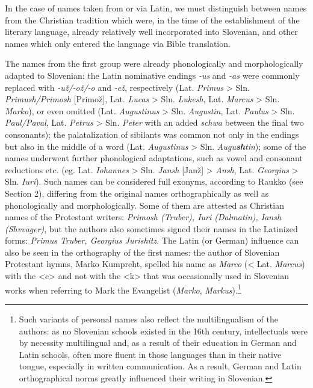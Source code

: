 \documentclass[output=paper,colorlinks,citecolor=brown,arabicfont,chinesefont]{langscibook}
\begin{document}
In the case of names taken from or via Latin, we must distinguish between names from the Christian tradition which were, in the time of the establishment of the literary language, already relatively well incorporated into Slovenian, and other names which only entered the language via Bible translation. 

The names from the first group were already phonologically and morphologically adapted to Slovenian: the Latin nominative endings \emph{-us} and \emph{-as} were commonly replaced with \emph{-už/-ož/-o} and \emph{-ež}, respectively (Lat. \emph{Primus} > Sln. \emph{Primush/Primosh} [Primož], Lat. \emph{Lucas} > Sln. \emph{Lukesh}, Lat. \emph{Marcus} > Sln. \emph{Marko}), or even omitted (Lat. \emph{Augustinus} > Sln. \emph{Augustin}, Lat. \emph{Paulus} > Sln. \emph{Paul/Paval}, Lat. \emph{Petrus} > Sln. \emph{Peter} with an added \emph{schwa} between the final two consonants); the palatalization of sibilants was common not only in the endings but also in the middle of a word (Lat. \emph{Augustinus} > Sln. \emph{Augu\textbf{sh}tin}); some of the names underwent further phonological adaptations, such as vowel and consonant reductions etc. (eg. Lat. \emph{Iohannes} > Sln. \emph{Jansh} [Janž] > \emph{Ansh}, Lat. \emph{Georgius} > Sln. \emph{Iuri}). Such names can be considered full exonyms, according to Raukko (see Section 2), differing from the original names orthographically as well as phonologically and morphologically. Some of them are attested as Christian names of the Protestant writers: \emph{Primosh (Truber), Iuri (Dalmatin), Iansh (Shvvager)}, but the authors also sometimes signed their names in the Latinized forms: \emph{Primus Truber, Georgius Jurishitz}. The Latin (or German) influence can also be seen in the orthography of the first names: the author of Slovenian Protestant hymns, Marko Kumpreht, spelled his name as \emph{Marco} (< Lat. \emph{Marcus}) with the <c> and not with the <k> that was occasionally used in Slovenian works when referring to Mark the Evangelist (\emph{Marko}, \emph{Markus}).\footnote{Such variants of personal names also reflect the multilingualism of the authors: as no Slovenian schools existed in the 16th century, intellectuals were by necessity multilingual \citep[23, 43--44]{Ahacic2014} and, as a result of their education in German and Latin schools, often more fluent in those languages than in their native tongue, especially in written communication. As a result, German and Latin orthographical norms greatly influenced their writing in Slovenian.}  
\end{document}
